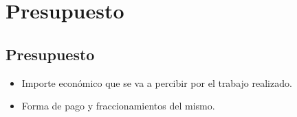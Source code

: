 
\chapter{Presupuesto} %

\label{Chapter6} %


\section{Presupuesto}

\begin{itemize}
	\item Importe económico que se va a percibir por el trabajo realizado.
	\item Forma de pago y fraccionamientos del mismo.
\end{itemize}
